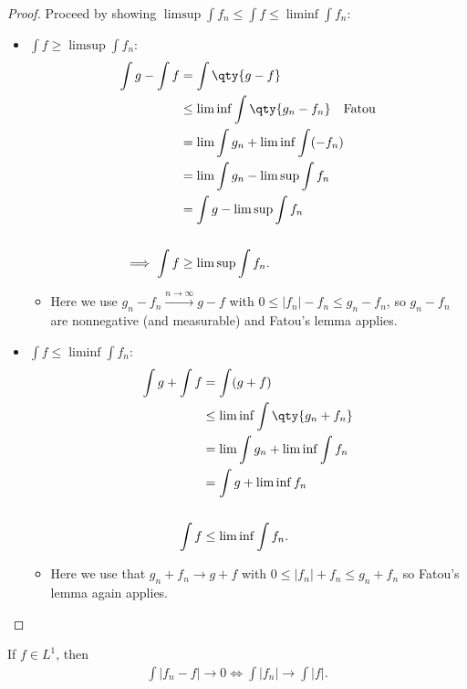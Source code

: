 \begin{proof}

Proceed by showing
\(\limsup \int f_n \leq \int f \leq \liminf \int f_n\):

\begin{itemize}
\item
  \(\int f \geq \limsup \int f_n\):
  \begin{align*}
  \int g - \int f 
  &= \int \qty{g-f} \\
  &\leq \liminf \int \qty{g_n - f_n} \quad \text{Fatou} \\
  &= \lim \int g_n + \liminf \int (-f_n) \\
  &= \lim \int g_n - \limsup \int f_n \\
  &= \int g - \limsup \int f_n \\
  \\
  \implies \int f &\geq \limsup \int f_n
  .\end{align*}

  \begin{itemize}
  \tightlist
  \item
    Here we use \(g_n - f_n \overset{n\to\infty}\longrightarrow g-f\)
    with
    \(0 \leq {\left\lvert {f_n} \right\rvert} - f_n \leq g_n - f_n\), so
    \(g_n - f_n\) are nonnegative (and measurable) and Fatou's lemma
    applies.
  \end{itemize}
\item
  \(\int f \leq \liminf \int f_n\):
  \begin{align*}
  \int g + \int f 
  &= \int(g+f) \\
  &\leq \liminf \int \qty{g_n + f_n} \\
  &= \lim \int g_n + \liminf \int f_n \\
  &= \int g + \liminf f_n \\
  \\
  \int f &\leq \liminf \int f_n
  .\end{align*}

  \begin{itemize}
  \tightlist
  \item
    Here we use that \(g_n + f_n \to g+f\) with
    \(0 \leq {\left\lvert {f_n} \right\rvert} + f_n \leq g_n + f_n\) so
    Fatou's lemma again applies.
  \end{itemize}
\end{itemize}

\end{proof}

\begin{proposition}

If \(f\in L^1\), then
\begin{align*}
\int{\left\lvert {f_n - f} \right\rvert} \to 0 \iff \int {\left\lvert {f_n} \right\rvert} \to \int {\left\lvert {f} \right\rvert}
.\end{align*}

\end{proposition}

